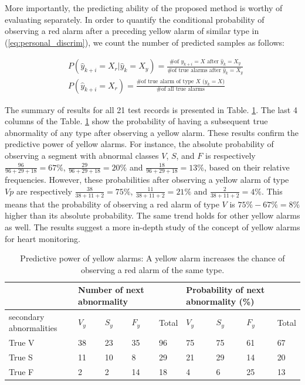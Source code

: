 More importantly, the predicting ability of the proposed method is worthy of evaluating separately. In order to quantify the conditional probability of observing a red alarm after a preceding yellow alarm of similar type in (\ref{eq:personal_discrim}), we count the number of predicted samples as follows:

\begin{align}
\nonumber 
&P(\hat{y}_{k+i}=X_r|\hat{y}_{k}=X_y)=\frac{\text{\# of $y_{k+i}=X$ after $\hat{y}_k=X_y$}}{\text{\# of true alarms after $\hat{y}_k=X_y$}} \\
&P(\hat{y}_{k+i}=X_r)=\frac{\text{\# of true alarm of type $X$ ($y_{k}=X$)}}{\text{\# of all true alarms}} 
\end{align}

The summary of results for all 21 test records is presented in Table. \ref{table:pred}. The last 4 columns of the Table. \ref{table:pred} show the probability of having a subsequent true abnormality of any type after observing a yellow alarm. %
These results confirm the predictive power of yellow alarms. 
For instance, the absolute probability of observing a segment with abnormal classes $V$, $S$, and $F$ is respectively $\frac{96}{96+29+18}=67\%$, $\frac{29}{96+29+18}=20\%$ and $\frac{18}{96+29+18}=13\%$, based on their relative frequencies. However, these probabilities after observing a yellow alarm of type $Vp$ are respectively $\frac{38}{38+11+2}=75\%$, $\frac{11}{38+11+2}=21\%$ and $\frac{2}{38+11+2}=4\%$. This means that the probability of observing a red alarm of type $V$ is $75\%-67\%=8\%$ higher than its absolute probability. The same trend holds for other yellow alarms as well. The results suggest a more in-depth study of the concept of yellow alarms for heart monitoring.

\begin{table}
	\caption{Predictive power of yellow alarms: A yellow alarm increases the chance of observing a red alarm of the same type.}
	\centering
	\begin{tabular}{|m{3.5em}|| m{1.4em} || m{1.4em} || m{1.4em} ||m{1.4em}|| m{1.4em} || m{1.4em} || m{1.4em} || m{1.4em}|}
		\hline
		& \multicolumn{3}{m{8em}}{Number of next abnormality }& &\multicolumn{3}{m{8em}}{Probability of next abnormality (\%)}  & \\ 
		\hline 
		secondary abnormalities & $V_y$ & $S_y$ & $F_y$ & Total & $V_y$ & $S_y$ & $F_y$ & Total \\ 
		\hline 
		True V & 38 & 23 & 35& 96 & 75 & 75 & 61 & 67 \\ 
		\hline 
		True S & 11 & 10 & 8 & 29 & 21 & 29 & 14& 20 \\ 
		\hline 
		True F & 2 & 2 & 14 & 18 & 4 & 6 & 25 & 13 \\ 
		\hline 
	\end{tabular} 
	\label{table:pred}
\end{table}


